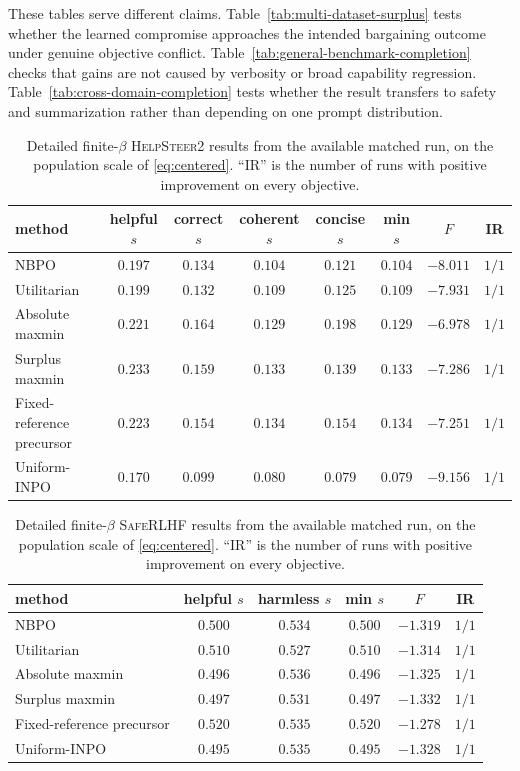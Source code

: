 \documentclass{article}
\theoremstyle{remark}
\theoremstyle{plain}
\newcommand{\NBPO}{\textsc{NBPO}}
\begin{document}
These tables serve different claims.  Table~\ref{tab:multi-dataset-surplus} tests whether the learned compromise approaches the intended bargaining outcome under genuine objective conflict.  Table~\ref{tab:general-benchmark-completion} checks that gains are not caused by verbosity or broad capability regression.  Table~\ref{tab:cross-domain-completion} tests whether the result transfers to safety and summarization rather than depending on one prompt distribution.

\begin{table}[htbp]
\centering\footnotesize
\setlength{\tabcolsep}{2.0pt}
\caption{Detailed finite-$\beta$ \textsc{HelpSteer2} results from the available matched run, on the population scale of \eqref{eq:centered}. ``IR'' is the number of runs with positive improvement on every objective.}
\label{tab:final-hs2}
\begin{tabular}{lccccccc}
\toprule
method & helpful $s$ & correct $s$ & coherent $s$ & concise $s$ & min $s$ & $F$ & IR\\
\midrule
\NBPO{} & $0.197$ & $0.134$ & $0.104$ & $0.121$ & $0.104$ & $-8.011$ & $1/1$\\
Utilitarian & $0.199$ & $0.132$ & $0.109$ & $0.125$ & $0.109$ & $-7.931$ & $1/1$\\
Absolute maxmin & $0.221$ & $0.164$ & $0.129$ & $0.198$ & $0.129$ & $-6.978$ & $1/1$\\
Surplus maxmin & $0.233$ & $0.159$ & $0.133$ & $0.139$ & $0.133$ & $-7.286$ & $1/1$\\
Fixed-reference precursor & $0.223$ & $0.154$ & $0.134$ & $0.154$ & $0.134$ & $-7.251$ & $1/1$\\
Uniform-INPO & $0.170$ & $0.099$ & $0.080$ & $0.079$ & $0.079$ & $-9.156$ & $1/1$\\
\bottomrule
\end{tabular}
\end{table}

\begin{table}[htbp]
\centering\footnotesize
\setlength{\tabcolsep}{2.5pt}
\caption{Detailed finite-$\beta$ \textsc{SafeRLHF} results from the available matched run, on the population scale of \eqref{eq:centered}. ``IR'' is the number of runs with positive improvement on every objective.}
\label{tab:final-saferlhf}
\begin{tabular}{lccccc}
\toprule
method & helpful $s$ & harmless $s$ & min $s$ & $F$ & IR\\
\midrule
\NBPO{} & $0.500$ & $0.534$ & $0.500$ & $-1.319$ & $1/1$\\
Utilitarian & $0.510$ & $0.527$ & $0.510$ & $-1.314$ & $1/1$\\
Absolute maxmin & $0.496$ & $0.536$ & $0.496$ & $-1.325$ & $1/1$\\
Surplus maxmin & $0.497$ & $0.531$ & $0.497$ & $-1.332$ & $1/1$\\
Fixed-reference precursor & $0.520$ & $0.535$ & $0.520$ & $-1.278$ & $1/1$\\
Uniform-INPO & $0.495$ & $0.535$ & $0.495$ & $-1.328$ & $1/1$\\
\bottomrule
\end{tabular}
\end{table}
\end{document}
